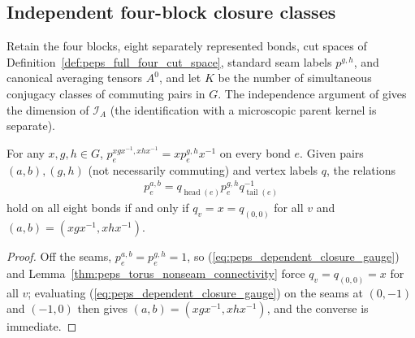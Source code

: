 \subsection{Independent four-block closure classes}
\label{sec:peps_dependent_closure_dimension}

Retain the four blocks, eight separately represented bonds, cut spaces of
Definition~\ref{def:peps_full_four_cut_space}, standard seam labels
$p^{g,h}$, and canonical averaging tensors $A^0$, and let $K$ be the
number of simultaneous conjugacy classes of commuting pairs in $G$. The
independence argument of \cite[Theorem~5.9]{Schuch2010PEPS} gives the
dimension of $\mathcal I_A$ (the identification with a microscopic parent
kernel is separate).

\begin{lemma}%
    \label{thm:peps_dependent_closure_gauge}
    \leanok
    For any $x,g,h\in G$, $p^{xgx^{-1},xhx^{-1}}_e=xp^{g,h}_ex^{-1}$ on
    every bond $e$. Given pairs $(a,b),(g,h)$ (not necessarily commuting)
    and vertex labels $q$, the relations
    \begin{align}
        p^{a,b}_e=q_{\operatorname{head}(e)}p^{g,h}_e
        q_{\operatorname{tail}(e)}^{-1}
        \label{eq:peps_dependent_closure_gauge}
    \end{align}
    hold on all eight bonds if and only if $q_v=x=q_{(0,0)}$ for all $v$
    and $(a,b)=(xgx^{-1},xhx^{-1})$.
\end{lemma}
\begin{proof}\leanok
    Off the seams, $p^{a,b}_e=p^{g,h}_e=1$, so
    (\ref{eq:peps_dependent_closure_gauge}) and
    Lemma~\ref{thm:peps_torus_nonseam_connectivity} force
    $q_v=q_{(0,0)}=x$ for all $v$; evaluating
    (\ref{eq:peps_dependent_closure_gauge}) on the seams at $(0,-1)$ and
    $(-1,0)$ then gives $(a,b)=(xgx^{-1},xhx^{-1})$, and the converse is
    immediate.
\end{proof}

